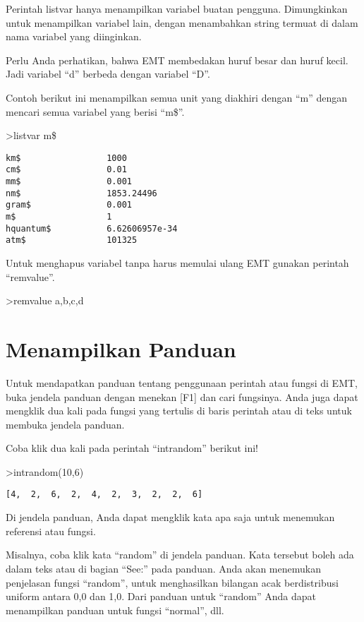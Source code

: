\documentclass[
]{book}
\begin{document}
Perintah listvar hanya menampilkan variabel buatan pengguna. Dimungkinkan untuk menampilkan variabel lain, dengan menambahkan string termuat di dalam nama variabel yang diinginkan.

Perlu Anda perhatikan, bahwa EMT membedakan huruf besar dan huruf kecil. Jadi variabel ``d'' berbeda dengan variabel ``D''.

Contoh berikut ini menampilkan semua unit yang diakhiri dengan ``m'' dengan mencari semua variabel yang berisi ``m\$''.

\textgreater listvar m\$

\begin{verbatim}
km$                 1000
cm$                 0.01
mm$                 0.001
nm$                 1853.24496
gram$               0.001
m$                  1
hquantum$           6.62606957e-34
atm$                101325
\end{verbatim}

Untuk menghapus variabel tanpa harus memulai ulang EMT gunakan perintah ``remvalue''.

\textgreater remvalue a,b,c,d

\chapter{Menampilkan Panduan}\label{menampilkan-panduan}

Untuk mendapatkan panduan tentang penggunaan perintah atau fungsi di EMT, buka jendela panduan dengan menekan {[}F1{]} dan cari fungsinya. Anda juga dapat mengklik dua kali pada fungsi yang tertulis di baris perintah atau di teks untuk membuka jendela panduan.

Coba klik dua kali pada perintah ``intrandom'' berikut ini!

\textgreater intrandom(10,6)

\begin{verbatim}
[4,  2,  6,  2,  4,  2,  3,  2,  2,  6]
\end{verbatim}

Di jendela panduan, Anda dapat mengklik kata apa saja untuk menemukan referensi atau fungsi.

Misalnya, coba klik kata ``random'' di jendela panduan. Kata tersebut boleh ada dalam teks atau di bagian ``See:'' pada panduan. Anda akan menemukan penjelasan fungsi ``random'', untuk menghasilkan bilangan acak berdistribusi uniform antara 0,0 dan 1,0. Dari panduan untuk ``random'' Anda dapat menampilkan panduan untuk fungsi ``normal'', dll.
\end{document}
